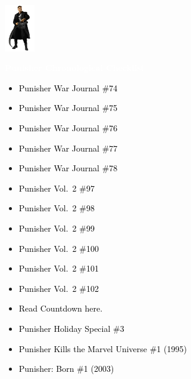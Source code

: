 \documentclass[12pt]{article}
\newcommand{\checkbox}{\raisebox{0.0ex}{\fbox{\rule{0ex}{1.5ex} \rule{1.5ex}{0ex}}}}
\begin{document}
\begin{center}
    \vspace*{2cm}
    \includegraphics[width=0.1\textwidth]{PUNISHER1.PNG}
    \vspace{0.3cm}

    {\Huge \textbf{\textcolor{white}{Punisher Chronological Checklist}}}
\end{center}

\vspace{0.3cm}
\noindent
\begin{tcolorbox}[
  colback=white!95!gray,
  colframe=black,
  width=\textwidth,
  arc=4mm,
  auto outer arc,
  boxrule=0.8pt,
  left=8pt,right=8pt,top=8pt,bottom=8pt
]
\begin{itemize}[left=0pt,label={\checkbox}]
    \item \textcolor{black}{Punisher War Journal \#74}
    \item \textcolor{black}{Punisher War Journal \#75}
    \item \textcolor{black}{Punisher War Journal \#76}
    \item \textcolor{black}{Punisher War Journal \#77}
    \item \textcolor{black}{Punisher War Journal \#78}
    \item \textcolor{black}{Punisher Vol.\ 2 \#97}
    \item \textcolor{black}{Punisher Vol.\ 2 \#98}
    \item \textcolor{black}{Punisher Vol.\ 2 \#99}
    \item \textcolor{black}{Punisher Vol.\ 2 \#100}
    \item \textcolor{black}{Punisher Vol.\ 2 \#101}
    \item \textcolor{black}{Punisher Vol.\ 2 \#102}
    \item \textcolor{black}{Read Countdown here.}
    \item \textcolor{black}{Punisher Holiday Special \#3}
    \item \textcolor{black}{Punisher Kills the Marvel Universe \#1 (1995)}
    \item \textcolor{black}{Punisher: Born \#1 (2003)}
\end{itemize}
\end{tcolorbox}
\end{document}
